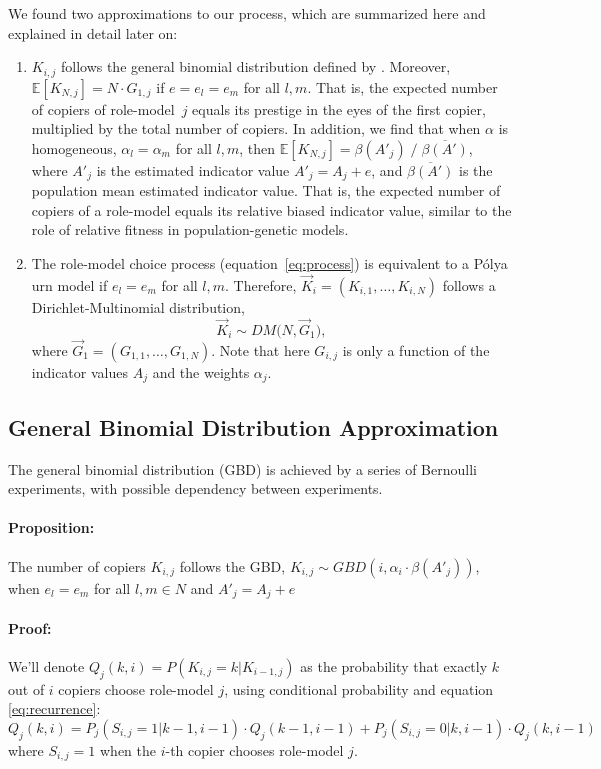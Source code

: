 \documentclass[11pt]{article}
\begin{document}
We found two approximations to our process, which are summarized here and explained in detail later on:
\begin{enumerate}
\item 
$K_{i,j}$ follows the general binomial distribution defined by \citet{GBD}.
Moreover, $\mathbb{E}[K_{N,j}] = N \cdot G_{1,j}$ if $e=e_l=e_m$ for all $l,m$.
 That is, the expected number of copiers of role-model~$j$ equals its prestige in the eyes of the first copier, multiplied by the total number of copiers. 
 In addition, we find that when $\alpha$ is homogeneous, $\alpha_l=\alpha_m$ for all $l,m$, then $\mathbb{E}[K_{N,j}] = \beta(A'_j) \; / \; \overline{\beta(A') }$, where $A'_j$ is the estimated indicator value $A'_j=A_j+e$, and 
 $\overline{ \beta(A') }$ is the population mean estimated indicator value. 
 That is, the expected number of copiers of a role-model equals its relative biased indicator value, similar to the role of relative fitness in population-genetic models.
\item The role-model choice process (equation~\ref{eq:process}) is equivalent to a P\'{o}lya urn model if $e_l=e_m$ for all $l,m$. 
Therefore, $\vec{K}_i = (K_{i,1}, \ldots, K_{i,N})$ follows a Dirichlet-Multinomial distribution,
\begin{equation}
\vec{K}_i \sim \mathit{DM}\big(N, \vec{G}_1\big), 
\end{equation}
where $\vec{G}_1 = (G_{1,1}, \ldots, G_{1,N})$.
Note that here $G_{i,j}$ is only a function of the indicator values $A_j$ and the weights $\alpha_j$.
\end{enumerate}


\subsection{General Binomial Distribution Approximation}
The general binomial distribution (GBD) is achieved by a series of Bernoulli experiments, with possible dependency between experiments.
\paragraph{Proposition:} The number of copiers $K_{i,j}$ follows the GBD, $K_{i,j} \sim GBD(i,\alpha_i\cdot\beta(A'_j))$, when $e_l=e_m$ for all $l,m \in N$ and $A'_j=A_j + e$ 
\paragraph{Proof: } We'll denote $Q_j(k,i)=P(K_{i,j} = k | K_{i-1,j})$ as the probability that exactly $k$ out of $i$ copiers choose role-model $j$, using conditional probability and equation \ref{eq:recurrence}:
\begin{equation}\label{recursive}
Q_j(k,i) = P_j(S_{i,j}=1 | k-1,i-1) \cdot Q_j(k-1,i-1) + P_j(S_{i,j} =0 | k,i-1) \cdot Q_j(k,i-1)
\end{equation}
where $S_{i,j} =1 $ when the $i$-th copier chooses role-model $j$.
\end{document}
